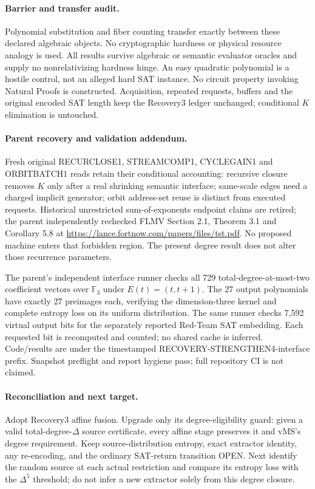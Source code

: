 \documentclass[11pt]{article}
\begin{document}
\paragraph{Barrier and transfer audit.}
Polynomial substitution and fiber counting transfer exactly between these
declared algebraic objects. No cryptographic hardness or physical resource
analogy is used. All results survive algebraic or semantic evaluator
oracles and supply no nonrelativizing hardness hinge. An easy quadratic
polynomial is a hostile control, not an alleged hard SAT instance. No
circuit property invoking Natural Proofs is constructed. Acquisition,
repeated requests, buffers and the original encoded SAT length keep the
Recovery3 ledger unchanged; conditional $K$ elimination is untouched.

\paragraph{Parent recovery and validation addendum.}
Fresh original RECURCLOSE1, STREAMCOMP1, CYCLEGAIN1 and ORBITBATCH1 reads retain their conditional accounting: recursive closure removes $K$ only after a real shrinking semantic interface; same-scale edges need a charged implicit generator; orbit address-set reuse is distinct from executed requests. Historical unrestricted sum-of-exponents endpoint claims are retired; the parent independently rechecked FLMV Section 2.1, Theorem 3.1 and Corollary 5.8 at \url{https://lance.fortnow.com/papers/files/tst.pdf}. No proposed machine enters that forbidden region. The present degree result does not alter those recurrence parameters.

The parent's independent interface runner checks all 729 total-degree-at-most-two coefficient vectors over $\mathbb F_3$ under $E(t)=(t,t+1)$. The 27 output polynomials have exactly 27 preimages each, verifying the dimension-three kernel and complete entropy loss on its uniform distribution. The same runner checks 7,592 virtual output bits for the separately reported Red-Team SAT embedding. Each requested bit is recomputed and counted; no shared cache is inferred. Code/results are under the timestamped RECOVERY-STRENGTHEN4-interface prefix. Snapshot preflight and report hygiene pass; full repository CI is not claimed.

\paragraph{Reconciliation and next target.}
Adopt Recovery3 affine fusion. Upgrade only its degree-eligibility guard:
given a valid total-degree-$\Delta$ source certificate, every affine
stage preserves it and vMS's degree requirement. Keep source-distribution
entropy, exact extractor identity, any re-encoding, and the ordinary
SAT-return transition OPEN. Next identify the random source at each
actual restriction and compare its entropy loss with the $\Delta^5$
threshold; do not infer a new extractor solely from this degree closure.
\end{document}
